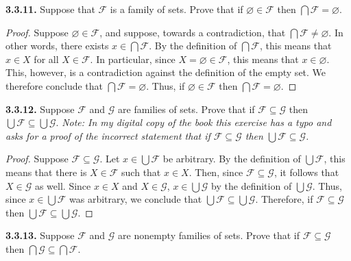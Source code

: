 \documentclass[12pt]{amsart}
\newenvironment{statement}[1]{\smallskip\noindent\color[rgb]{.6627, .3529, .6314} {\bf #1.}}{}
\theoremstyle{definition}
\theoremstyle{remark}
\begin{document}
\begin{statement}{3.3.11}
Suppose that $\mathcal{F}$ is a family of sets.
Prove that if $\varnothing \in \mathcal{F}$ then $\bigcap \mathcal{F} = \varnothing$.
\end{statement}

\begin{proof}
Suppose $\varnothing \in \mathcal{F}$, and suppose, towards a contradiction, that $\bigcap \mathcal{F} \neq \varnothing$.
In other words, there exists $x \in \bigcap \mathcal{F}$.
By the definition of $\bigcap \mathcal{F}$, this means that $x \in X$ for all $X \in \mathcal{F}$.
In particular, since $X = \varnothing \in \mathcal{F}$, this means that $x \in \varnothing$.
This, however, is a contradiction against the definition of the empty set.
We therefore conclude that $\bigcap \mathcal{F} = \varnothing$.
Thus, if $\varnothing \in \mathcal{F}$ then $\bigcap \mathcal{F} = \varnothing$.
\end{proof}


\begin{statement}{3.3.12}
Suppose $\mathcal{F}$ and $\mathcal{G}$ are families of sets.
Prove that if $\mathcal{F} \subseteq \mathcal{G}$ then $\bigcup \mathcal{F} \subseteq \bigcup \mathcal{G}$.
\emph{Note: In my digital copy of the book this exercise has a typo and asks for a proof of the incorrect statement that if $\mathcal{F} \subseteq \mathcal{G}$ then $\bigcup \mathcal{F} \subseteq \mathcal{G}$.}
\end{statement}

\begin{proof}
Suppose $\mathcal{F} \subseteq \mathcal{G}$.
Let $x \in \bigcup \mathcal{F}$ be arbitrary.
By the definition of $\bigcup \mathcal{F}$, this means that there is $X \in \mathcal{F}$ such that $x \in X$.
Then, since $\mathcal{F} \subseteq \mathcal{G}$, it follows that $X \in \mathcal{G}$ as well.
Since $x \in X$ and $X \in \mathcal{G}$, $x \in \bigcup \mathcal{G}$ by the definition of $\bigcup \mathcal{G}$.
Thus, since $x \in \bigcup \mathcal{F}$ was arbitrary, we conclude that $\bigcup \mathcal{F} \subseteq \bigcup \mathcal{G}$.
Therefore, if $\mathcal{F} \subseteq \mathcal{G}$ then $\bigcup \mathcal{F} \subseteq \bigcup \mathcal{G}$.
\end{proof}


\begin{statement}{3.3.13}
Suppose $\mathcal{F}$ and $\mathcal{G}$ are nonempty families of sets.
Prove that if $\mathcal{F} \subseteq \mathcal{G}$ then $\bigcap \mathcal{G} \subseteq \bigcap \mathcal{F}$.
\end{statement}
\end{document}
